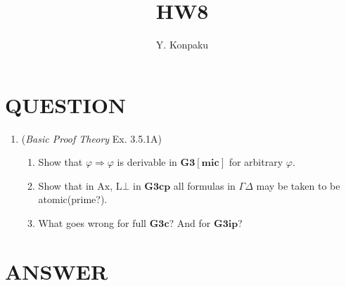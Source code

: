 \documentclass[12pt]{article}
\newcommand\A{\varphi}
\newcommand\GG\Gamma
\newcommand\D\Delta
\newcommand\TO\Rightarrow
\newcommand\PC[1]{\mathbf{#1}}
\newcommand\AX{\textrm{Ax}}
\newcommand\LB{\textrm{L$\bot$}}
\begin{document}
\title{HW8}
\author{Y. Konpaku}

\maketitle

\section{QUESTION}
\begin{enumerate}
    \item (\emph{Basic Proof Theory} Ex. 3.5.1A) \begin{enumerate}
        \item Show that $\A\TO\A$ is derivable in $\PC{G3[mic]}$ for arbitrary $\A$.
        \item Show that in $\AX$, $\LB$ in $\PC{G3cp}$ all formulas in $\GG\D$ may be taken to be atomic(prime?).
        \item What goes wrong for full $\PC{G3c}$? And for $\PC{G3ip}$?
    \end{enumerate}
\end{enumerate}


\section{ANSWER}
\end{document}
